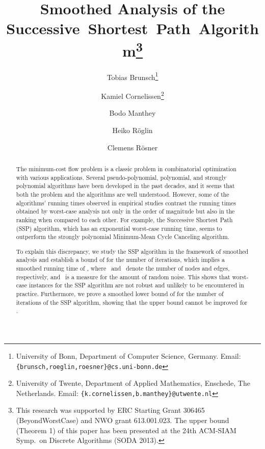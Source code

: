 \documentclass[11pt]{article}
\begin{document}
\title{Smoothed Analysis of the Successive~Shortest~Path~Algorithm\thanks{This research was supported by ERC Starting Grant 306465 (BeyondWorstCase)
and NWO grant 613.001.023. The upper bound (Theorem 1) of this paper has been presented at the 24th ACM-SIAM Symp.\ on Discrete Algorithms (SODA 2013).}}

\newcommand*\samethanks[1][\value{footnote}]{\footnotemark[#1]}

\author{Tobias Brunsch\thanks{University of Bonn,
                Department of Computer Science,
                Germany.
                Email: {\tt \{brunsch,roeglin,roesner\}@cs.uni-bonn.de}}
 \and Kamiel Cornelissen\thanks{University of Twente,
              Department of Applied Mathematics,
              Enschede, The Netherlands.
              Email: {\tt \{k.cornelissen,b.manthey\}@utwente.nl}}
 \and Bodo Manthey\samethanks[3]
 \and Heiko R{\"o}glin\samethanks[2]
 \and Clemens R{\"o}sner\samethanks[2]
}

\date{}

\maketitle

 
\begin{abstract}
The minimum-cost flow problem is a classic problem in combinatorial optimization with various applications. Several pseudo-poly\-no\-mi\-al,
polynomial, and strongly polynomial algorithms have been developed in the past decades, and it seems that both the problem and the
algorithms are well understood. However, some of the algorithms' running times observed in empirical studies contrast the running times
obtained by worst-case analysis not only in the order of magnitude but also in the ranking when compared to each other. For example, the
Successive Shortest Path (SSP) algorithm, which has an exponential worst-case running time, seems to outperform the strongly polynomial
Minimum-Mean Cycle Canceling algorithm.

To explain this discrepancy, we study the SSP algorithm in the framework of smoothed analysis and
establish a bound of  for the number of iterations, which implies a smoothed running time of , 
where~ and~ denote the number of nodes and edges, respectively, and~ is a measure for the amount of random noise. 
This shows that worst-case instances for the SSP algorithm are not robust and unlikely to be encountered in practice. Furthermore, we prove a
smoothed lower bound of  for the number of iterations of the SSP algorithm, showing that the
upper bound cannot be improved for .
\end{abstract}
\end{document}
